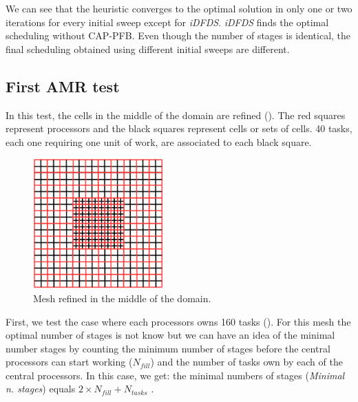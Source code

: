 \documentclass[letterpaper]{article}
\renewcommand{\(}{\left(}
\renewcommand{\)}{\right)}
\renewcommand{\[}{\left[}
\renewcommand{\]}{\right]}
\begin{document}
We can see that the heuristic converges to the optimal solution in only one or
two iterations for every initial sweep except for \emph{iDFDS}. \emph{iDFDS} 
finds the optimal scheduling without CAP-PFB. Even though the number of stages is
identical, the final scheduling obtained using different initial sweeps are
different.

\subsection{First AMR test}
In this test, the cells in the middle of the domain are refined ().
The red squares represent processors and the black squares represent cells
or sets of cells. 40 tasks, each one requiring one unit of work, are
associated to each black square.
\begin{figure}[H]
  \centering
  \includegraphics[width=5cm]{mesh}
  \caption{Mesh refined in the middle of the domain.}
  \label{mesh_1}
\end{figure}
First, we test the case where each processors owns 160 tasks (). For
this mesh the optimal number of stages is not know but we can have an idea of
the minimal number stages by counting the minimum number of stages before the
central processors can start working ($N_{fill}$) and the number of tasks own by
each of the central processors. In this case, we get: the minimal numbers of stages
(\emph{Minimal n. stages}) equals $2\times N_{fill}+N_{tasks}$ \cite{Adams2013}.
\end{document}
